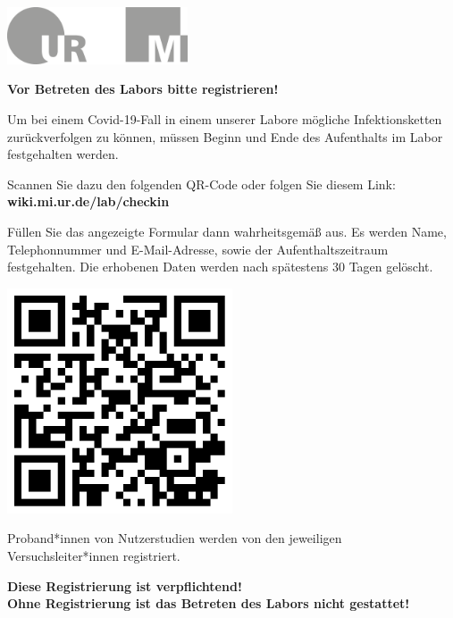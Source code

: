 \documentclass[24pt, a4paper, portrait]{article}
\begin{document}
\pagestyle{empty}

\raggedleft

\includegraphics[width=0.4\textwidth]{logo}

\vspace{1cm}
\sffamily
\centering
\huge

\textbf{Vor Betreten des Labors bitte registrieren!}

\vspace{1cm}

\raggedright
\Large

Um bei einem Covid-19-Fall in einem unserer Labore mögliche Infektionsketten zurückverfolgen zu können, müssen Beginn und Ende des Aufenthalts im Labor festgehalten werden.

\medskip

Scannen Sie dazu den folgenden QR-Code oder folgen Sie diesem Link: \textbf{wiki.mi.ur.de/lab/checkin}

\medskip

Füllen Sie das angezeigte Formular dann wahrheitsgemäß aus.
Es werden Name, Telephonnummer und E-Mail-Adresse, sowie der Aufenthaltszeitraum festgehalten.
Die erhobenen Daten werden nach spätestens 30 Tagen gelöscht.

\vspace{1cm}
\centering
\includegraphics[width=0.5\textwidth]{qr_checkin}

\vspace{1cm}
\raggedright
Proband*innen von Nutzerstudien werden von den jeweiligen Versuchsleiter*innen registriert.

\vspace{1cm}
\centering
\huge
\textbf{Diese Registrierung ist verpflichtend! \\ Ohne Registrierung ist das Betreten des Labors nicht gestattet!}
\end{document}
